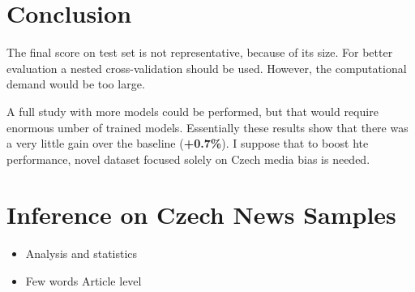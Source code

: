 \section{Conclusion}
The final score on test set is not representative, because of its size. For better evaluation a nested cross-validation should be used. However, the computational demand would be too large. 

A full study with more models could be performed, but that would require enormous umber of trained models. Essentially these results show that there was a very little gain over the baseline (\textbf{+0.7\%}). I suppose that to boost hte performance, novel dataset focused solely on Czech media bias is needed.


  

\section{Inference on Czech News Samples}
\begin{itemize}
    \item Analysis and statistics
    \item Few words Article level
\end{itemize}


